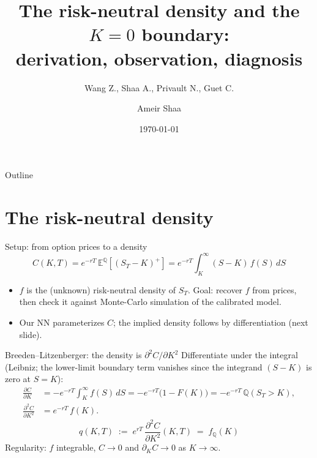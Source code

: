 \documentclass[aspectratio=169,11pt]{beamer}
\title{The risk-neutral density and the $K\!=\!0$ boundary:\\derivation, observation, diagnosis}
\subtitle{Wang Z., Shaa A., Privault N., Guet C.}
\author{Ameir Shaa}
\date{\today}
\institute{JCF manuscript --- LocalVolatility PINN pipeline}
\begin{document}
\maketitle

\begin{frame}{Outline}
  \tableofcontents
\end{frame}

\section{The risk-neutral density}

\begin{frame}{Setup: from option prices to a density}
  \[
    C(K,T) = e^{-rT}\,\mathbb{E}^{\mathbb{Q}}[(S_T-K)^+]
            = e^{-rT}\int_K^\infty (S-K)\,f(S)\,dS
  \]
  \begin{itemize}
    \item $f$ is the (unknown) risk-neutral density of $S_T$. Goal: recover $f$ from
          prices, then check it against Monte-Carlo simulation of the calibrated model.
    \item Our NN parameterizes $C$; the implied density follows by differentiation
          (next slide).
  \end{itemize}
\end{frame}

\begin{frame}{Breeden--Litzenberger: the density is $\partial^2 C/\partial K^2$}
  Differentiate under the integral (Leibniz; the lower-limit boundary term vanishes
  since the integrand $(S-K)$ is zero at $S=K$):
  \begin{align*}
    \frac{\partial C}{\partial K}
      &= -e^{-rT}\int_K^\infty f(S)\,dS
       = -e^{-rT}\bigl(1-F(K)\bigr)
       = -e^{-rT}\,\mathbb{Q}(S_T>K),\\[4pt]
    \frac{\partial^2 C}{\partial K^2}
      &= e^{-rT}\,f(K).
  \end{align*}
  \[
    \boxed{\,q(K,T) \;:=\; e^{rT}\,\frac{\partial^2 C}{\partial K^2}(K,T) \;=\; f_{\mathbb{Q}}(K)\,}
  \]
  {\footnotesize Regularity: $f$ integrable, $C\to 0$ and $\partial_K C\to 0$ as $K\to\infty$.}
\end{frame}
\end{document}
